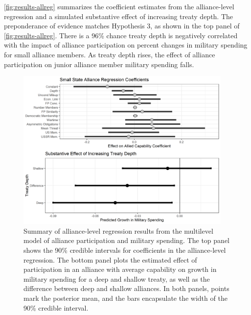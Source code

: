 \documentclass[12pt]{article}
\begin{document}
\autoref{fig:results-allreg} summarizes the coefficient estimates from the alliance-level regression and a simulated substantive effect of increasing treaty depth. 
The preponderance of evidence matches Hypothesis 3, as shown in the top panel of \autoref{fig:results-allreg}.
There is a 96\% chance treaty depth is negatively correlated with the impact of alliance participation on percent changes in military spending for small alliance members.
As treaty depth rises, the effect of alliance participation on junior alliance member military spending falls. 


\begin{figure}[htbp]
	\centering
		\includegraphics[width=0.95\textwidth]{../figures/results-allreg.png}
	\caption{Summary of alliance-level regression results from the multilevel model of alliance participation and military spending. The top panel shows the 90\% credible intervals for coefficients in the alliance-level regression. The bottom panel plots the estimated effect of participation in an alliance with average capability on growth in military spending for a deep and shallow treaty, as well as the difference between deep and shallow alliances. In both panels, points mark the posterior mean, and the bars encapsulate the width of the 90\% credible interval.}
	\label{fig:results-allreg}
\end{figure}
\end{document}
